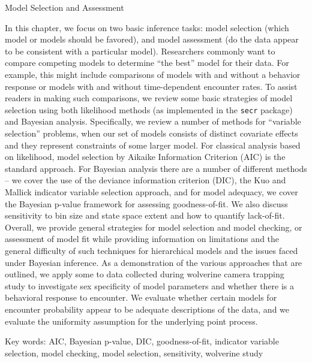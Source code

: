 Model Selection and Assessment


In this chapter, we focus on two basic inference tasks: model
selection (which model or models should be favored), and model
assessment (do the data appear to be consistent with a particular
model).  Researchers commonly want to compare competing models to
determine ``the best'' model for their data.  For example, this might
include comparisons of models with and without a behavior response or
models with and without time-dependent encounter rates.  To assist
readers in making such comparisons, we review some basic strategies of
model selection using both likelihood methods (as implemented in the
\mbox{\tt secr} package) and Bayesian analysis.  Specifically, we
review a number of methods for ``variable selection'' problems, when
our set of models consists of distinct covariate effects and they
represent constraints of some larger model.  For classical analysis
based on likelihood, model selection by Aikaike Information Criterion
(AIC) is the standard approach.  For Bayesian analysis there are a
number of different methods -- we cover the use of the deviance
information criterion (DIC), the Kuo and Mallick indicator variable
selection approach, and for model adequacy, we cover the Bayesian
p-value framework for assessing goodness-of-fit.  We also discuss
sensitivity to bin size and state space extent and how to quantify
lack-of-fit.  Overall, we provide general strategies for model
selection and model checking, or assessment of model fit while
providing information on limitations and the general difficulty of
such techniques for hierarchical models and the issues faced under
Bayesian inference.  As a demonstration of the various approaches that
are outlined, we apply some to data collected during wolverine camera
trapping study to investigate sex specificity of model parameters and
whether there is a behavioral response to encounter.  We evaluate
whether certain models for encounter probability appear to be adequate
descriptions of the data, and we evaluate the uniformity assumption
for the underlying point process.

Key words:  AIC, 
Bayesian p-value,
DIC, 
goodness-of-fit, 
indicator variable selection, 
model checking, model selection, 
sensitivity, wolverine study




